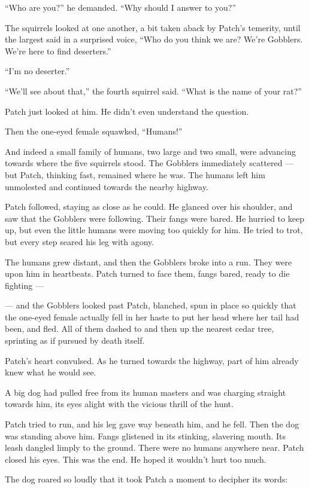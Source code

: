\documentclass[12pt]{memoir}
\begin{document}
“Who are you?” he demanded. “Why should I answer to you?”

The squirrels looked at one another, a bit taken aback by Patch’s
temerity, until the largest said in a surprised voice, “Who do you
think we are? We’re Gobblers. We’re here to find deserters.”

“I’m no deserter.”

“We’ll see about that,” the fourth squirrel said. “What is the name of
your rat?”

Patch just looked at him. He didn’t even understand the question.

Then the one-eyed female squawked, “Humans!”

And indeed a small family of humans, two large and two small, were
advancing towards where the five squirrels stood. The Gobblers
immediately scattered — but Patch, thinking fast, remained where he
was. The humans left him unmolested and continued towards the nearby
highway.

Patch followed, staying as close as he could. He glanced over his
shoulder, and saw that the Gobblers were following. Their fangs were
bared. He hurried to keep up, but even the little humans were moving
too quickly for him. He tried to trot, but every step seared his leg
with agony.

The humans grew distant, and then the Gobblers broke into a run. They
were upon him in heartbeats. Patch turned to face them, fangs bared,
ready to die fighting —

— and the Gobblers looked past Patch, blanched, spun in place so
quickly that the one-eyed female actually fell in her haste to put her
head where her tail had been, and fled. All of them dashed to and then
up the nearest cedar tree, sprinting as if pursued by death itself.

Patch’s heart convulsed. As he turned towards the highway, part of him
already knew what he would see.

A big dog had pulled free from its human masters and was charging
straight towards him, its eyes alight with the vicious thrill of the
hunt.

Patch tried to run, and his leg gave way beneath him, and he
fell. Then the dog was standing above him. Fangs glistened in its
stinking, slavering mouth. Its leash dangled limply to the
ground. There were no humans anywhere near. Patch closed his
eyes. This was the end. He hoped it wouldn’t hurt too much.

The dog roared so loudly that it took Patch a moment to decipher its
words:
\end{document}
